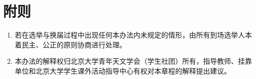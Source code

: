 \section{附则}

\begin{enumerate}[resume]
    \item 若在选举与换届过程中出现任何本办法内未规定的情形，由所有到场选举人本着民主、公正的原则协商进行处理。
    
    \item 本办法的解释权归北京大学青年天文学会（学生社团）所有，指导教师、挂靠单位和北京大学学生课外活动指导中心有权对本章程的解释提出建议。
\end{enumerate}

